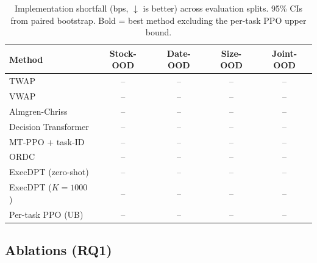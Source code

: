 \documentclass[sigconf,review,anonymous]{acmart}
\begin{document}
\begin{table}[t]
\caption{Implementation shortfall (bps, $\downarrow$ is better) across evaluation splits. 95\% CIs from paired bootstrap. Bold = best method excluding the per-task PPO upper bound.}
\label{tab:results}
\centering
\small
\begin{tabular}{@{}lcccc@{}}
\toprule
\textbf{Method} & \textbf{Stock-OOD} & \textbf{Date-OOD} & \textbf{Size-OOD} & \textbf{Joint-OOD} \\
\midrule
TWAP               & --  & --  & --  & -- \\
VWAP               & --  & --  & --  & -- \\
Almgren-Chriss      & --  & --  & --  & -- \\
Decision Transformer & -- & --  & --  & -- \\
MT-PPO + task-ID    & --  & --  & --  & -- \\
ORDC                & --  & --  & --  & -- \\
\midrule
ExecDPT (zero-shot) & --  & --  & --  & -- \\
ExecDPT ($K{=}1000$) & -- & --  & --  & -- \\
\midrule
Per-task PPO (UB)   & --  & --  & --  & -- \\
\bottomrule
\end{tabular}
\end{table}


\subsection{Ablations (RQ1)}
\end{document}
